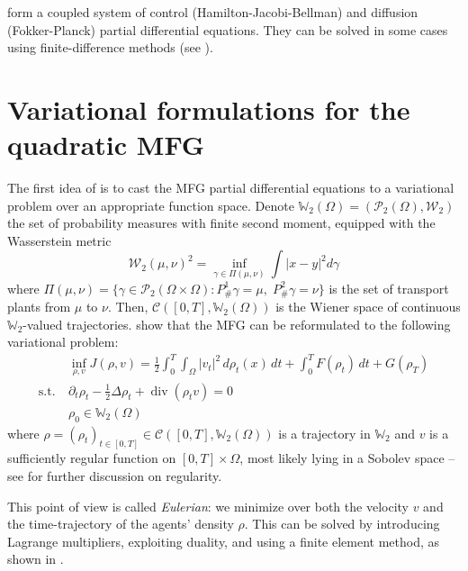 \documentclass[11pt]{article}
\newcommand{\WW}{\mathbb{W}}
\newcommand{\calC}{\mathcal{C}}
\newcommand{\calP}{\mathcal{P}}
\newcommand{\calW}{\mathcal{W}}
\newcommand{\suchthat}{\mathrm{s.t.}}
\DeclareMathOperator{\divg}{div}
\numberwithin{equation}{section}
\theoremstyle{definition}
\begin{document}
 form a coupled system of control (Hamilton-Jacobi-Bellman) and diffusion (Fokker-Planck) partial differential equations. They can be solved in some cases using finite-difference methods (see \textcite{achdou:hal-01456506}).

\section{Variational formulations for the quadratic MFG}

The first idea of \cite{benamou:hal-01295299} is to cast the MFG partial differential equations to a variational problem over an appropriate function space. Denote $\WW_2(\Omega) = (\calP_2(\Omega), \calW_2)$ the set of probability measures with finite second moment, equipped with the Wasserstein metric
\begin{equation}\label{eq:Wasserstein2Metric}
   	\calW_2(\mu,\nu)^2 = \inf_{\gamma\in\Pi(\mu,\nu)}
   	\int {|x-y|}^2 d\gamma
\end{equation}
where $\Pi(\mu,\nu) =\{ \gamma \in \calP_2(\Omega\times\Omega) : P^1_{\#}\gamma = \mu,\; P^2_{\#}\gamma = \nu \}$ is the set of transport plants from $\mu$ to $\nu$.
Then, $\mathcal{C}([0, T], \WW_2(\Omega))$ is the Wiener space of continuous $\WW_2$-valued trajectories.
\textcite{benamou:hal-01295299} show that the MFG can be reformulated to the following variational problem:
\begin{equation}\label{eq:EulerianProblem}
\begin{aligned}
   	&\inf_{\rho,v} J(\rho, v) =
   	\frac{1}{2}\int_0^T\int_\Omega |v_t|^2 \,d\rho_t(x)\,dt + \int_0^T F(\rho_t)\,dt + G(\rho_T)
   	\\
   	\suchthat\ &\partial_t \rho_t - \frac12\Delta \rho_t + \divg(\rho_t v) = 0 \\
   	&\rho_0 \in \WW_2(\Omega)	
\end{aligned}
\end{equation}
where $\rho = (\rho_t)_{t\in[0,T]}\in \calC([0,T], \WW_2(\Omega))$ is a trajectory in $\WW_2$ and $v$ is a sufficiently regular function on $[0,T] \times \Omega$, most likely lying in a Sobolev space -- see \cite{benamou:hal-01295299} for further discussion on regularity.

This point of view \cite{benamou:hal-01295299} is called \textit{Eulerian}: we minimize over both the velocity $v$ and the time-trajectory of the agents' density $\rho$. This can be solved by introducing Lagrange multipliers, exploiting duality, and using a finite element method, as shown in \cite{benamou:hal-01295299}.
\end{document}
